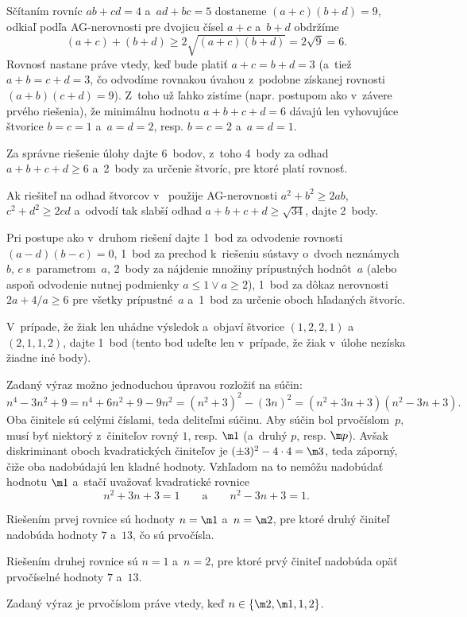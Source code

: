 {\ineriesenie
Sčítaním rovníc $ab+cd=4$ a~$ad+bc=5$ dostaneme $(a+c)(b+d)=9$, odkiaľ podľa AG-nerovnosti pre dvojicu čísel $a+c$ a~$b+d$ obdržíme
$$
(a+c)+(b+d)\ge2\sqrt{(a+c)(b+d)}=2\sqrt9=6.
$$
Rovnosť nastane práve vtedy, keď bude platiť $a+c=b+d=3$ (a~tiež $a+b=c+d=3$, čo
odvodíme rovnakou úvahou z~podobne získanej rovnosti $(a+b)(c+d)=9$). Z~toho
už ľahko zistíme (napr. postupom ako v~závere prvého riešenia), že minimálnu hodnotu $a+b+c+d=6$ dávajú len
vyhovujúce štvorice $b=c=1$ a~$a=d=2$, resp. $b=c=2$ a~$a=d=1$.

\nobreak\medskip\petit\noindent
Za správne riešenie úlohy dajte 6~bodov, z~toho 4~body za odhad $a+b+c+d\ge6$ a~2~body za určenie štvoríc, pre ktoré platí rovnosť.

Ak riešiteľ na odhad štvorcov v~ použije AG-nerovnosti $a^2+b^2\ge2ab$, $c^2+d^2\ge2cd$ a~odvodí tak slabší odhad $a+b+c+d\ge\sqrt{34}$, dajte 2~body.

Pri postupe ako v~druhom riešení dajte 1~bod za odvodenie rovnosti $(a-d)(b-c)=0$, 1~bod za prechod k~riešeniu sústavy o~dvoch neznámych $b$, $c$ s~parametrom~$a$, 2~body za nájdenie množiny prípustných hodnôt~$a$ (alebo aspoň odvodenie nutnej podmienky $a\le 1 \vee a\ge2$), 1~bod za dôkaz nerovnosti $2a+4/a\ge6$ pre všetky prípustné~$a$ a~1~bod za určenie oboch hľadaných štvoríc.

V~prípade, že žiak len uhádne výsledok a~objaví štvorice $(1,2,2,1)$ a~$(2,1,1,2)$, dajte 1~bod (tento bod udeľte len v~prípade, že žiak v~úlohe nezíska žiadne iné body).


\endpetit
\bigbreak
}

{%
Zadaný výraz možno jednoduchou úpravou rozložiť na súčin:
$$
n^4-3n^2+9 = n^4+6n^2+9-9n^2 = (n^2+3)^2-(3n)^2  =(n^2+3n+3)(n^2-3n+3).
$$
Oba činitele sú celými číslami, teda deliteľmi súčinu. Aby súčin bol prvočíslom~$p$, musí byť niektorý z~činiteľov rovný $1$, resp. $\m1$ (a~druhý $p$, resp. $\m p$). Avšak diskriminant oboch kvadratických činiteľov je $(\pm3)^2-4\cdot4=\m3$, teda záporný, čiže oba nadobúdajú len kladné hodnoty. Vzhľadom na to nemôžu nadobúdať hodnotu $\m1$ a~stačí uvažovať kvadratické rovnice
$$
n^2+3n+3=1 \qquad\text{a}\qquad n^2-3n+3=1.
$$

Riešením prvej rovnice sú hodnoty $n=\m1$ a~$n=\m2$, pre ktoré druhý činiteľ nadobúda hodnoty $7$ a~$13$, čo sú prvočísla.

Riešením druhej rovnice sú $n=1$ a~$n=2$, pre ktoré prvý činiteľ nadobúda opäť prvočíselné hodnoty $7$ a~$13$.

\odpoved Zadaný výraz je prvočíslom práve vtedy, keď $n\in\{\m2,\m1,1,2\}$.
}

